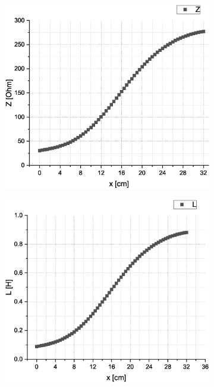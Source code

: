 \documentclass[10pt,a4paper]{article}
\begin{document}
\begin{flushleft}
\begin{itemize}

\begin{figure}[H]
\centering
\begin{subfigure}[c]{.5\textwidth}
\centering
\includegraphics[scale=0.3]{Imped1}
\label{fig:l1_imped}
\end{subfigure}%
%
\begin{subfigure}[c]{.5\textwidth}
\centering
\includegraphics[scale=0.3]{Indukt1}
\label{fig:l1_ind}
\end{subfigure}%


\end{figure}
\end{itemize}
\end{flushleft}
\end{document}
